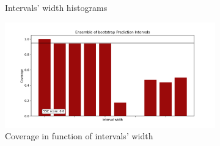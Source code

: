 \begin{figure}[ht]
\begin{subfigure}[b]{0.32\textwidth}
        \caption{Intervals' width histograms}
        \label{subfig:app-timeseries-width-histograms-cpoint}
    \end{subfigure}
    \hfill
    \begin{subfigure}[b]{0.32\textwidth}
        \centering
        \includegraphics[width=1.15\textwidth, height=0.85\textwidth]{Figures/timeseries/with-change-point/coverage-vs-width-timeseries-problem-with-change-point.png}
        \caption{Coverage in function of intervals' width}
        \label{subfig:app-timeseries-coverage-width-cpoint}
    \end{subfigure}
    \hfill %
    \begin{subfigure}[b]{0.32\textwidth} %
        \centering

\end{subfigure}
\end{figure}
